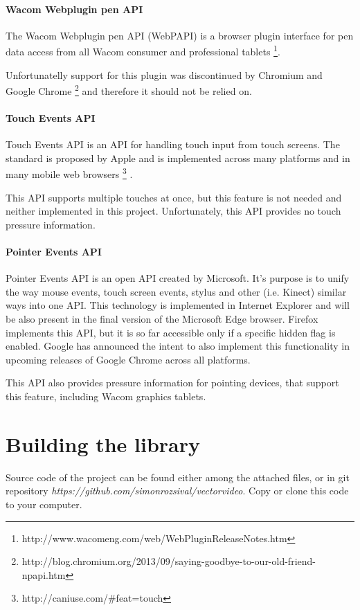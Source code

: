 \paragraph{Wacom Webplugin pen API}
The Wacom Webplugin pen API (WebPAPI) is a browser plugin interface for pen data access from all Wacom consumer and professional tablets \cite{}\footnote{http://www.wacomeng.com/web/WebPluginReleaseNotes.htm}.

Unfortunatelly support for this plugin was discontinued by Chromium and Google Chrome \footnote{http://blog.chromium.org/2013/09/saying-goodbye-to-our-old-friend-npapi.htm} and therefore it should not be relied on.

\paragraph{Touch Events API}
Touch Events API is an API for handling touch input from touch screens. The standard is proposed by Apple and is implemented across many platforms and in many mobile web browsers \footnote{http://caniuse.com/\#feat=touch} \cite{}.

This API supports multiple touches at once, but this feature is not needed and neither implemented in this project. Unfortunately, this API provides no touch pressure information.

\paragraph{Pointer Events API}
Pointer Events API is an open API created by Microsoft. It's purpose is to unify the way mouse events, touch screen events, stylus and other (i.e. Kinect) similar ways into one API. This technology is implemented in Internet Explorer and will be also present in the final version of the Microsoft Edge browser. Firefox implements this API, but it is so far accessible only if a specific hidden flag is enabled. Google has announced the intent to also implement this functionality in upcoming releases of Google Chrome across all platforms.

This API also provides pressure information for pointing devices, that support this feature, including Wacom graphics tablets.



\section{Building the library}

Source code of the project can be found either among the attached files, or in git repository \textit{https://github.com/simonrozsival/vectorvideo}. Copy or clone this code to your computer.

